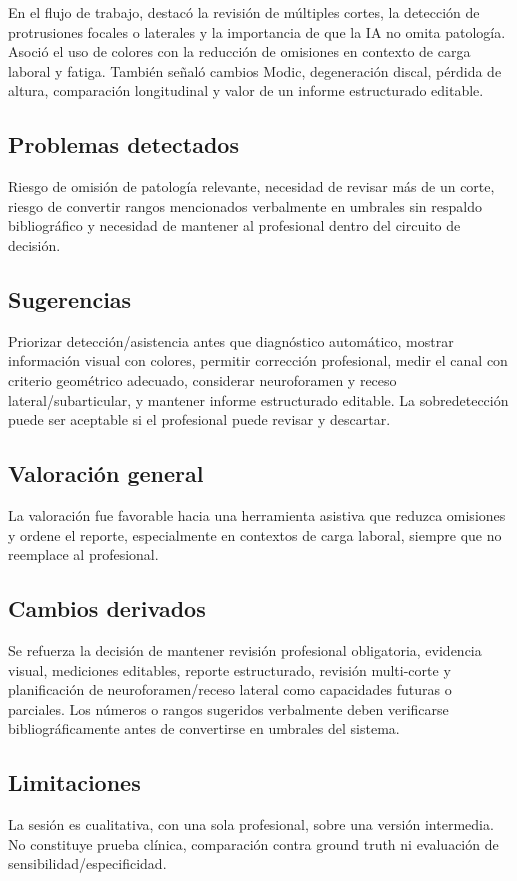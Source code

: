 En el flujo de trabajo, destacó la revisión de múltiples cortes, la detección de protrusiones focales o laterales y la importancia de que la IA no omita patología. Asoció el uso de colores con la reducción de omisiones en contexto de carga laboral y fatiga. También señaló cambios Modic, degeneración discal, pérdida de altura, comparación longitudinal y valor de un informe estructurado editable.

\subsection*{Problemas detectados}
Riesgo de omisión de patología relevante, necesidad de revisar más de un corte, riesgo de convertir rangos mencionados verbalmente en umbrales sin respaldo bibliográfico y necesidad de mantener al profesional dentro del circuito de decisión.

\subsection*{Sugerencias}
Priorizar detección/asistencia antes que diagnóstico automático, mostrar información visual con colores, permitir corrección profesional, medir el canal con criterio geométrico adecuado, considerar neuroforamen y receso lateral/subarticular, y mantener informe estructurado editable. La sobredetección puede ser aceptable si el profesional puede revisar y descartar.

\subsection*{Valoración general}
La valoración fue favorable hacia una herramienta asistiva que reduzca omisiones y ordene el reporte, especialmente en contextos de carga laboral, siempre que no reemplace al profesional.

\subsection*{Cambios derivados}
Se refuerza la decisión de mantener revisión profesional obligatoria, evidencia visual, mediciones editables, reporte estructurado, revisión multi-corte y planificación de neuroforamen/receso lateral como capacidades futuras o parciales. Los números o rangos sugeridos verbalmente deben verificarse bibliográficamente antes de convertirse en umbrales del sistema.

\subsection*{Limitaciones}
La sesión es cualitativa, con una sola profesional, sobre una versión intermedia. No constituye prueba clínica, comparación contra ground truth ni evaluación de sensibilidad/especificidad.

